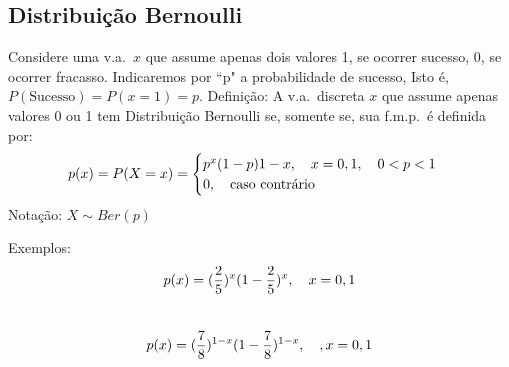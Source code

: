  \subsection{Distribuição Bernoulli}
 Considere uma v.a.\ $x$ que assume apenas dois valores 1, se ocorrer sucesso,
 0, se ocorrer fracasso. Indicaremos por ``p" a probabilidade de sucesso, Isto
 é, $P(\text{Sucesso})=P(x=1)=p$.
 Definição: A v.a.\ discreta $x$ que assume apenas valores 0 ou 1 tem Distribuição
 Bernoulli se, somente se, sua f.m.p.\ é definida por:
 \begin{align}
   p(x)=P(X=x)= \begin{cases}
     p^{x}(1-p){1-x}, \text{\quad} x=0,1, \text{\quad} 0<p<1\\
     0, \text{\quad caso contrário}
   \end{cases}
 \end{align}
 Notação: $X \sim Ber(p)$

 Exemplos: 
 $$p(x)=(\frac{2}{5})^x(1-\frac{2}{5})^x, \text{\quad}x=0,1$$\\
 $$p(x)=(\frac{7}{8})^{1-x}(1-\frac{7}{8})^{1-x}, \text{\quad }, x=0,1$$


